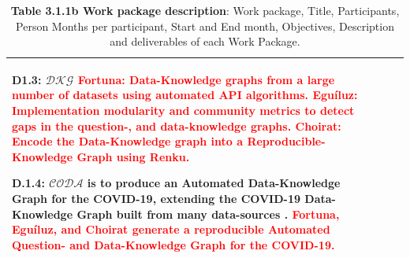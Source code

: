 \documentclass[11pt, a4paper]{article} %
\begin{document}
\begin{table}[h!]
\begin{center}
\begin{tabular}{|m{3cm} || m{12cm} || m{1cm}|}
                         {\bf D1.3: $\mathcal{DKG}$} \textcolor{red}{{\bf Fortuna}:
                         Data-Knowledge graphs from a large number of datasets using
                         automated API algorithms. {\bf Egu\'iluz}: Implementation modularity and community metrics to
                         detect gaps in the question-, and data-knowledge graphs. {\bf
                         Choirat}: Encode the Data-Knowledge graph into a
                         Reproducible-Knowledge Graph using Renku.}

                         {\bf D.1.4: $\mathcal{CODA}$}
                         is to produce an Automated Data-Knowledge Graph for the
                         COVID-19, extending the COVID-19 Data-Knowledge Graph built from many
                         data-sources \citep{KGcovid19}. \textcolor{red}{{\bf Fortuna}, {\bf
                         Egu\'iluz}, and {\bf Choirat} generate a reproducible
                         Automated Question- and Data-Knowledge Graph for the COVID-19.} &  \\
    \hline\hline
    \hline\hline
  \end{tabular}
\end{center}
\caption*{{{\bf Table 3.1.1b Work package description}: Work package,
    Title, Participants, Person Months per participant, Start and End
    month, Objectives, Description and deliverables of each Work
    Package.}}
\end{table}
\end{document}
